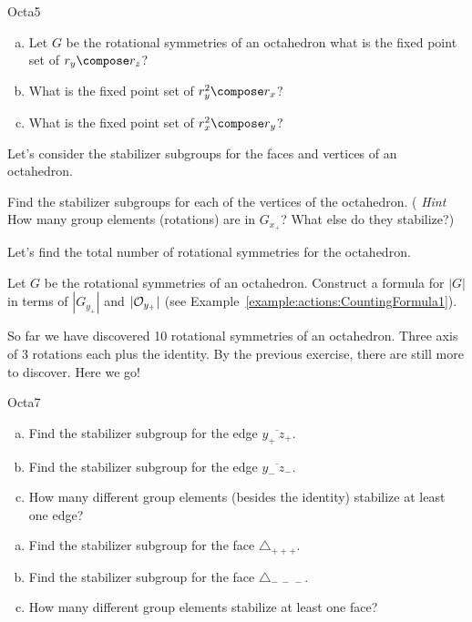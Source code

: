 \begin {exercise}{Octa5}
\begin {enumerate}[(a)]
\item Let $G$ be the rotational symmetries of an octahedron what is the fixed point set of $r_{y}\compose r_{z}$?
\item What is the fixed point set of $r_{y}^2\compose r_{x}$? 
\item What is the fixed point set of $r_{x}^2\compose r_{y}$?
\end{enumerate}
\end {exercise}

Let's consider the stabilizer subgroups for the faces and vertices of an octahedron.  
 
\begin{exercise}\label{exercise:actions:Octa5a}
Find the stabilizer subgroups for each of the vertices of the octahedron. ( \emph{Hint} How many group elements (rotations) are in $G_{x_+}$?  What else do they stabilize?)
\end{exercise}

Let's find the total number of rotational symmetries for the octahedron. 

\begin{exercise}\label{exercise:actions:Octa6} 
Let $G$ be the rotational symmetries of an octahedron. Construct a formula for $|G|$ in terms of $| G_{y_+}|$ and $|{\cal O}_{y_+}|$ (see Example~\ref{example:actions:CountingFormula1}).
 \end {exercise}

So far we have discovered 10 rotational symmetries of an octahedron.  Three axis of 3 rotations each plus the identity.  By the previous exercise, there are still more to discover.  Here we go! 

\begin {exercise}{Octa7}
\begin {enumerate}[(a)]
\item Find the stabilizer subgroup for the edge $\overline{y_+~z_+}$. 
\item Find the stabilizer subgroup for the edge $\overline{y_-~z_-}$.
\item How many different group elements (besides the identity) stabilize at least one edge?
\end{enumerate}
\end{exercise}	

\begin{exercise}\label{exercise:actions:Octa8}
\begin {enumerate}[(a)]
\item Find the stabilizer subgroup for the face $\triangle_{+ + +}$.
\item Find the stabilizer subgroup for the face $\triangle_{ -~-~-}$.
\item How many different group elements stabilize at least one face?
\end {enumerate}
\end{exercise}

